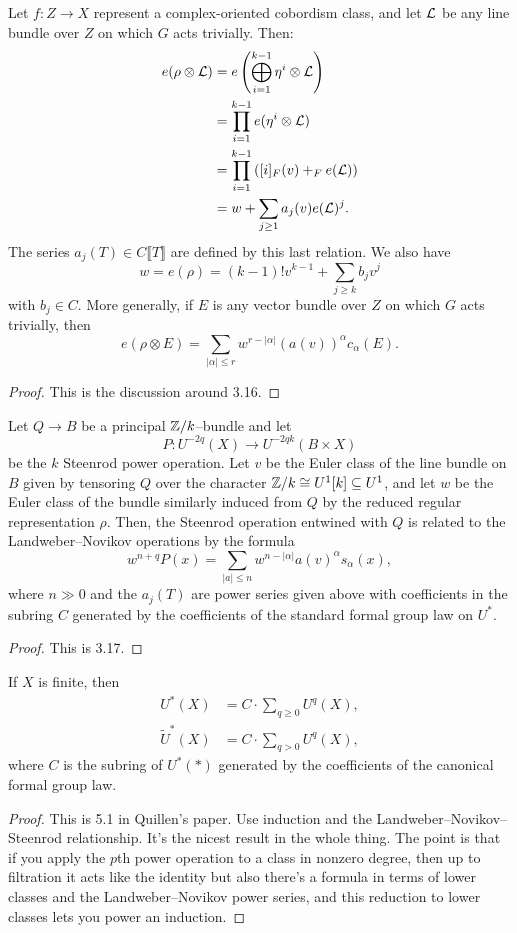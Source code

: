 \begin{definition}
Let $f: Z \to X$ represent a complex-oriented cobordism class, and let $\mathcal{L}$ be any line bundle over $Z$ on which $G$ acts trivially.  Then:
\begin{align*}
e(\rho \otimes \mathcal{L}) & = e \left( \bigoplus_{i=1}^{k-1} \eta^i \otimes \mathcal{L} \right) \\
& = \prod_{i=1}^{k-1} e(\eta^i \otimes \mathcal{L}) \\
& = \prod_{i=1}^{k-1} \left( [i]_F(v) +_F e(\mathcal{L}) \right) \\
& = w + \sum_{j \ge 1} a_j(v) e(\mathcal{L})^j.
\end{align*}
The series $a_j(T) \in C\llbracket T \rrbracket$ are defined by this last relation.  We also have \[w = e(\rho) = (k-1)! v^{k-1} + \sum_{j \ge k} b_j v^j\] with $b_j \in C$.  More generally, if $E$ is any vector bundle over $Z$ on which $G$ acts trivially, then \[e(\rho \otimes E) = \sum_{|\alpha| \le r} w^{r - |\alpha|} (a(v))^\alpha c_\alpha(E).\]
\end{definition}
\begin{proof}
This is the discussion around 3.16.
\end{proof}

\begin{theorem}
Let $Q \to B$ be a principal $\mathbb Z/k$--bundle and let \[P: U^{-2q}(X) \to U^{-2qk}(B \times X)\] be the $k${\th} Steenrod power operation. Let $v$ be the Euler class of the line bundle on $B$ given by tensoring $Q$ over the character $\mathbb Z/k \cong U^1[k] \subseteq U^1$, and let $w$ be the Euler class of the bundle similarly induced from $Q$ by the reduced regular representation $\rho$.  Then, the Steenrod operation entwined with $Q$ is related to the Landweber--Novikov operations by the formula \[w^{n+q} P(x) = \sum_{|a| \le n} w^{n - |\alpha|} a(v)^\alpha s_\alpha(x),\] where $n \gg 0$ and the $a_j(T)$ are power series given above with coefficients in the subring $C$ generated by the coefficients of the standard formal group law on $U^*$.
\end{theorem}
\begin{proof}
This is 3.17.
\end{proof}

\begin{theorem}
If $X$ is finite, then
\begin{align*}
U^*(X) & = C \cdot \sum_{q \ge 0} U^q(X), \\
\widetilde U^*(X) & = C \cdot \sum_{q > 0} U^q(X),
\end{align*}
where $C$ is the subring of $U^*(*)$ generated by the coefficients of the canonical formal group law.
\end{theorem}
\begin{proof}
This is 5.1 in Quillen's paper. Use induction and the Landweber--Novikov--Steenrod relationship.  It's the nicest result in the whole thing.  The point is that if you apply the $p$th power operation to a class in nonzero degree, then up to filtration it acts like the identity but also there's a formula in terms of lower classes and the Landweber--Novikov power series, and this reduction to lower classes lets you power an induction.
\end{proof}

